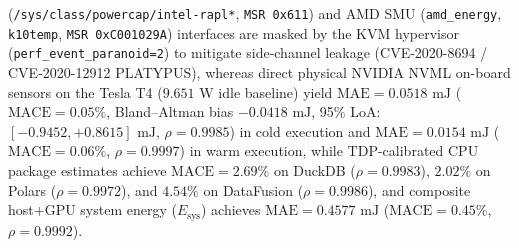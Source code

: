 \documentclass[10pt,a4paper]{article}
\begin{document}
(\texttt{/\allowbreak{}sys/\allowbreak{}class/\allowbreak{}powercap/\allowbreak{}intel-rapl*}, \texttt{MSR 0x611}) and AMD SMU (\texttt{amd\_energy}, \texttt{k10temp}, \texttt{MSR 0xC001029A}) interfaces are masked by the KVM hypervisor (\texttt{perf\_\allowbreak{}event\_\allowbreak{}paranoid=2}) to mitigate side-channel leakage (CVE-2020-8694 / CVE-2020-12912 PLATYPUS), whereas direct physical NVIDIA NVML on-board sensors on the Tesla T4 ($9.651\text{ W}$ idle baseline) yield $\text{MAE} = 0.0518\text{ mJ}$ ($\text{MACE} = 0.05\%$, Bland--Altman bias $-0.0418\text{ mJ}$, 95\% LoA: $[-0.9452, +0.8615]\text{ mJ}$, $\rho = 0.9985$) in cold execution and $\text{MAE} = 0.0154\text{ mJ}$ ($\text{MACE} = 0.06\%$, $\rho = 0.9997$) in warm execution, while TDP-calibrated CPU package estimates achieve $\text{MACE} = 2.69\%$ on DuckDB ($\rho = 0.9983$), $2.02\%$ on Polars ($\rho = 0.9972$), and $4.54\%$ on DataFusion ($\rho = 0.9986$), and composite host+GPU system energy ($E_{\text{sys}}$) achieves $\text{MAE} = 0.4577\text{ mJ}$ ($\text{MACE} = 0.45\%$, $\rho = 0.9992$).
\end{document}
